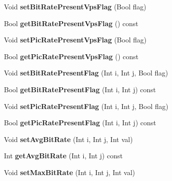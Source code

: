 \begin{DoxyCompactItemize}
Void {\bfseries set\+Bit\+Rate\+Present\+Vps\+Flag} (Bool flag)
\item 
\mbox{\label{class_t_com_v_p_s_v_u_i_add68467737a36846513facfe7f5f335b}} 
Bool {\bfseries get\+Bit\+Rate\+Present\+Vps\+Flag} () const
\item 
\mbox{\label{class_t_com_v_p_s_v_u_i_ad59abdab77d15a6c191df050b5f6e853}} 
Void {\bfseries set\+Pic\+Rate\+Present\+Vps\+Flag} (Bool flag)
\item 
\mbox{\label{class_t_com_v_p_s_v_u_i_a3d2e22c00f79ec0ca2810f8421edfdfd}} 
Bool {\bfseries get\+Pic\+Rate\+Present\+Vps\+Flag} () const
\item 
\mbox{\label{class_t_com_v_p_s_v_u_i_ad6dcf2ab46e05595162ed9c1577d212b}} 
Void {\bfseries set\+Bit\+Rate\+Present\+Flag} (Int i, Int j, Bool flag)
\item 
\mbox{\label{class_t_com_v_p_s_v_u_i_a60a3f7b1728f4c4bdabedba04da12f31}} 
Bool {\bfseries get\+Bit\+Rate\+Present\+Flag} (Int i, Int j) const
\item 
\mbox{\label{class_t_com_v_p_s_v_u_i_a25a3711f595a076346c3cbbeb7189eb1}} 
Void {\bfseries set\+Pic\+Rate\+Present\+Flag} (Int i, Int j, Bool flag)
\item 
\mbox{\label{class_t_com_v_p_s_v_u_i_ab0f84eb61a9524c2d042f1877ba79b9b}} 
Bool {\bfseries get\+Pic\+Rate\+Present\+Flag} (Int i, Int j) const
\item 
\mbox{\label{class_t_com_v_p_s_v_u_i_acaab8f50c316b66f0b3924fc3b6b2b06}} 
Void {\bfseries set\+Avg\+Bit\+Rate} (Int i, Int j, Int val)
\item 
\mbox{\label{class_t_com_v_p_s_v_u_i_a2ce6dac2da6162f579b36274c212e36c}} 
Int {\bfseries get\+Avg\+Bit\+Rate} (Int i, Int j) const
\item 
\mbox{\label{class_t_com_v_p_s_v_u_i_adff2fd1637e04e00e80d89acba242c37}} 
Void {\bfseries set\+Max\+Bit\+Rate} (Int i, Int j, Int val)

\end{DoxyCompactItemize}
